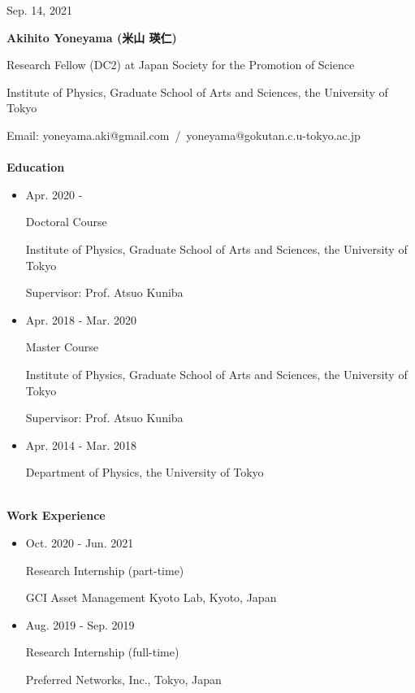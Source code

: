 \documentclass[dvipdfmx]{jsarticle}
\begin{document}
%
%
%
%
\begin{flushright}
Sep. 14, 2021
\end{flushright}
%
%
%
%
{\bf\Large Akihito Yoneyama (米山 瑛仁)}
\vspace{3mm}
\par
Research Fellow (DC2) at Japan Society for the Promotion of Science
\par
Institute of Physics, Graduate School of Arts and Sciences, the University of Tokyo
\par
Email: yoneyama.aki@gmail.com{\ }/{\ }yoneyama@gokutan.c.u-tokyo.ac.jp
%
%
%
%
{\ }\\\\
\vspace{3mm}
{\bf\large Education}
\vspace{-6mm}
\\\hrulefill
\begin{itemize}
\item
Apr. 2020 - 
\par
Doctoral Course
\par
Institute of Physics, Graduate School of Arts and Sciences, the University of Tokyo
\par
Supervisor: Prof. Atsuo Kuniba
\item
Apr. 2018 - Mar. 2020
\par
Master Course
\par
Institute of Physics, Graduate School of Arts and Sciences, the University of Tokyo
\par
Supervisor: Prof. Atsuo Kuniba
\item
Apr. 2014 - Mar. 2018
\par
Department of Physics, the University of Tokyo
\end{itemize}
%
%
%
%
{\ }\\
\vspace{3mm}
{\bf\large Work Experience}
\vspace{-6mm}
\\\hrulefill
\begin{itemize}
\item
Oct. 2020 - Jun. 2021
\par
Research Internship (part-time)
\par
GCI Asset Management Kyoto Lab, Kyoto, Japan
%
%
\item
Aug. 2019 - Sep. 2019
\par
Research Internship (full-time)
\par
Preferred Networks, Inc., Tokyo, Japan
\end{itemize}
\end{document}
